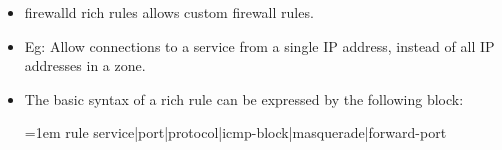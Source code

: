 

\begin{flushleft}
	\begin{itemize}
		\item firewalld rich rules allows custom firewall rules.
		\item Eg: Allow connections to a service from a single IP address, instead of all IP addresses in a zone.
		\item The basic syntax of a rich rule can be expressed by the following block:
		\bigskip
		\begin{tcolorbox}[breakable,notitle,boxrule=0pt,colback=pink,colframe=pink]
			\color{black}
			\font=1em
			rule
			\newline
   			  [source]
   			\newline
			  [destination]
			\newline
			  service|port|protocol|icmp-block|masquerade|forward-port
			\newline
			  [log]
			\newline
			  [audit]
			\font=4pt
		\end{tcolorbox}
	\end{itemize}
\end{flushleft}

\newpage

